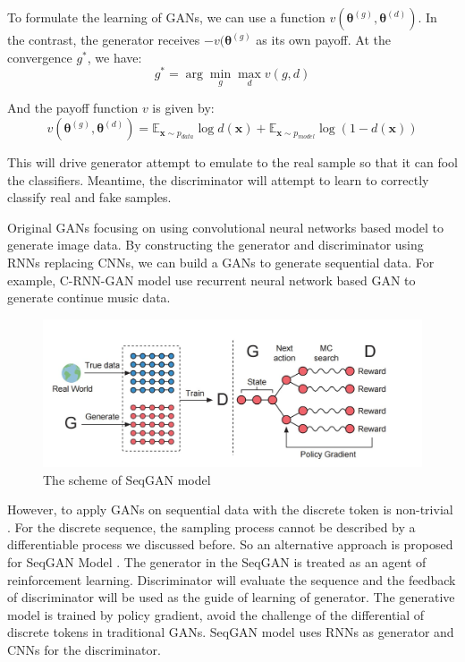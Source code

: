 To formulate the learning of GANs, we can use a function $ v(\bm{\theta}^{(g)}, \bm{\theta}^{(d)}) $. In the contrast, the generator receives $ -v(\bm{\theta}^{(g)} $ as its own payoff. At the convergence $ g^* $, we have:
\[ g^* = \arg \min_{g} \max_{d}v(g, d) \]

And the payoff function $ v $ is given by:
\[ v(\bm{\theta}^{(g)}, \bm{\theta}^{(d)}) = \mathbb{E}_{\mathbf{x}\sim p_{\textit{data}}}\log d(\bm{x})+ \mathbb{E}_{\mathbf{x}\sim p_{\textit{model}}}\log (1- d(\bm{x}))\]

This will drive generator attempt to emulate to the real sample so that it can fool the classifiers. Meantime, the discriminator will attempt to learn to correctly classify real and fake samples.

Original GANs focusing on using convolutional neural networks based model to generate image data. By constructing the generator and discriminator using RNNs replacing CNNs, we can build a GANs to generate sequential data. For example, C-RNN-GAN model \cite{mogren2016crnngan} use recurrent neural network based GAN to generate continue music data. 

\begin{figure}[htbp]
    \centering
    \includegraphics[width=0.9\linewidth]{SwqGAN.jpg}
    \caption{The scheme of SeqGAN model}
    \label{fig:seqGAN}
\end{figure}

However, to apply GANs on sequential data with the discrete token is non-trivial \cite{huszar2015}. For the discrete sequence, the sampling process cannot be described by a differentiable process we discussed before. So an alternative approach is proposed for SeqGAN Model \cite{yu2016seqgan}. The generator in the SeqGAN is treated as an agent of reinforcement learning. Discriminator will evaluate the sequence and the feedback of discriminator will be used as the guide of learning of generator. The generative model is trained by policy gradient, avoid the challenge of the differential of discrete tokens in traditional GANs. SeqGAN model uses RNNs as generator and CNNs for the discriminator.
